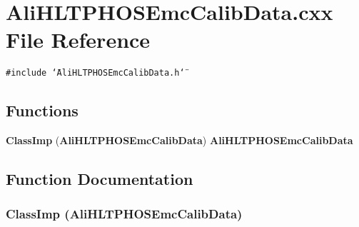 \section{Ali\-HLTPHOSEmc\-Calib\-Data.cxx File Reference}
\label{AliHLTPHOSEmcCalibData_8cxx}
{\tt \#include \char`\"{}Ali\-HLTPHOSEmc\-Calib\-Data.h\char`\"{}}\par
\subsection*{Functions}
\begin{CompactItemize}
\item 
{\bf Class\-Imp} ({\bf Ali\-HLTPHOSEmc\-Calib\-Data}) {\bf Ali\-HLTPHOSEmc\-Calib\-Data}
\end{CompactItemize}


\subsection{Function Documentation}
\subsubsection{\setlength{\rightskip}{0pt plus 5cm}Class\-Imp ({\bf Ali\-HLTPHOSEmc\-Calib\-Data})}\label{AliHLTPHOSEmcCalibData_8cxx_a0}


